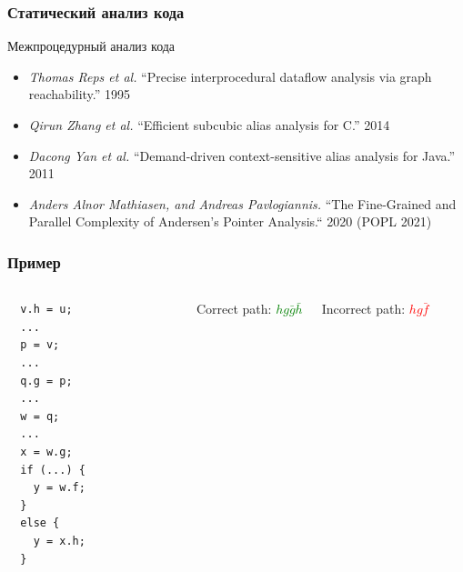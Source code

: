 \documentclass{beamer}
\begin{document}
\begin{frame}[fragile]
  
  \frametitle{Статический анализ кода}

Межпроцедурный анализ кода
\begin{itemize}
\item \emph{Thomas Reps et al.} ``Precise interprocedural dataflow analysis via graph reachability.'' 1995 
\pause
\item \emph{Qirun Zhang et al.}  ``Efficient subcubic alias analysis for C.'' 2014
\item \emph{Dacong Yan et al.} ``Demand-driven context-sensitive alias analysis for Java.'' 2011
\pause
\item \emph{Anders Alnor Mathiasen, and Andreas Pavlogiannis.} ``The Fine-Grained and Parallel Complexity of Andersen’s Pointer Analysis.`` 2020 (POPL 2021)
\end{itemize} 

\end{frame}

\begin{frame}[fragile]
  
  \frametitle{Пример}
  \begin{columns}[c] %

 \begin{verbatim}
  v.h = u;
  ...
  p = v;
  ...
  q.g = p;
  ...
  w = q;
  ...
  x = w.g;
  if (...) {
    y = w.f;
  }
  else {
    y = x.h;
  }    
\end{verbatim}

\begin{figure}[h]
    \centering        
\end{figure}
Correct path: \textcolor{green}{$hg\bar{g}\bar{h}$}

Incorrect path: \textcolor{red}{$hg\bar{f}$}

\end{columns}

\end{frame}
\end{document}
